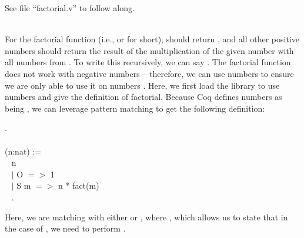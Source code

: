 
See file ``factorial.v'' to follow along. 

~\\
For the factorial function (i.e.,  or  for short),  should return , 
and all other positive numbers should return the result of the multiplication of the given number 
 with all numbers from . 
To write this recursively, we can say . 
The factorial function does not work with negative numbers 
-- therefore, we can use  numbers to ensure we are only able to use it on numbers . 
Here, we first load the  library to use  numbers and give the definition of factorial. 
Because Coq defines  numbers as being , we can leverage pattern matching to 
get the following definition: 

\begin{code}
	\Load {}.
	\\ \\
	\Fixpoint {} (n:nat) := 				\\ \-\ \quad
 		\match n \with 						\\ \-\ \qquad
  			$\mid$ O $=>$ 1				\\ \-\ \qquad
    			$\mid$ S m $=>$ n * fact(m)		\\ \-\ \quad
  		\End.
\end{code}

\noindent
Here, we are matching  with either  or , where , 
which allows us to state that in the case of , we need to perform . 








